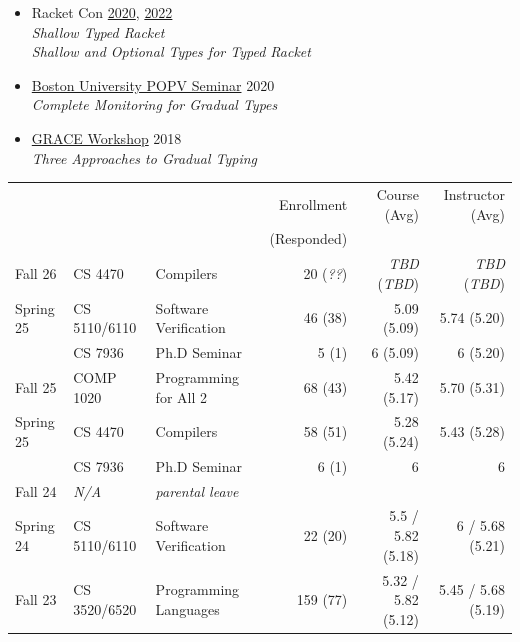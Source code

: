 \documentclass[11pt]{article}
\begin{document}
\begin{itemize}
    \href{http://njpls.org/oct22.html}{NJPLS} \\
    \emph{Little Tricky Logic: Misconceptions in the Understanding of LT\/L}
  \item
    Racket Con \hfill \href{https://con.racket-lang.org/2020}{2020}, \href{https://con.racket-lang.org/2022}{2022}\\
    \emph{Shallow Typed Racket} \\
    \emph{Shallow and Optional Types for Typed Racket}
  \item
    \href{https://www.bu.edu/cs/research/popv/seminar/}{Boston University POPV Seminar} \hfill {2020}\\
    \emph{Complete Monitoring for Gradual Types}
  \item
    \href{https://2018.splashcon.org/track/grace-2018-papers}{GRACE Workshop} \hfill 2018\\
    \emph{Three Approaches to Gradual Typing}
\end{itemize}




\noindent\begin{tabular}{lll@{}rrr}
  & & & Enrollment & Course (Avg) & Instructor (Avg) \\
  & & & (Responded) & & \\
  Fall   26 & CS   4470    & Compilers             & 20 (\emph{??}) & \emph{TBD} (\emph{TBD}) & \emph{TBD} (\emph{TBD}) \\
  Spring 25 & CS 5110/6110 & Software Verification & 46 (38) & {5.09} (5.09) & {5.74} (5.20) \\
            & CS   7936    & Ph.D Seminar          & 5 (1) & {6} (5.09) & 6 (5.20) \\
  Fall   25 & COMP 1020    & Programming for All 2 & 68 (43) & {5.42} (5.17) & {5.70} (5.31) \\
  Spring 25 & CS 4470      & Compilers             & 58 (51)    & 5.28 (5.24) & 5.43 (5.28) \\
            & CS 7936      & Ph.D  Seminar          & 6 (1)     & {6} & {6} \\
  Fall   24 & \emph{N/A} & \emph{parental leave} \\
  Spring 24 & CS 5110/6110 & Software Verification &  22 (20) & 5.5 / 5.82 (5.18)  & 6 / 5.68 (5.21) \\
  Fall   23 & CS 3520/6520 & Programming Languages & 159 (77) & 5.32 / 5.82 (5.12) & 5.45 / 5.68 (5.19)
\end{tabular}
\end{document}
